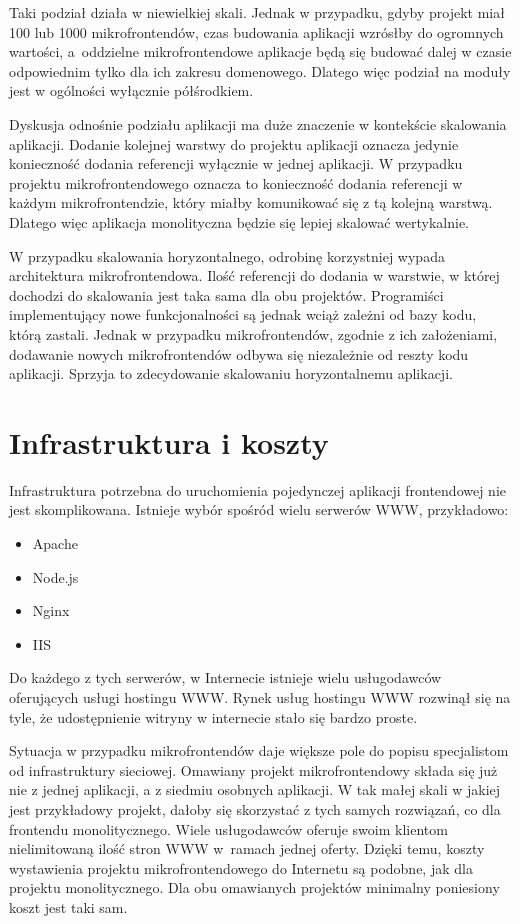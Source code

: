 \documentclass{SGGW-thesis}
\begin{document}
  Taki podział działa w niewielkiej skali. Jednak w przypadku, gdyby projekt miał 100 lub 1000 mikrofrontendów, czas budowania aplikacji wzrósłby do ogromnych wartości, a~oddzielne mikrofrontendowe aplikacje będą się budować dalej w czasie odpowiednim tylko dla ich zakresu domenowego. Dlatego więc podział na moduły jest w ogólności wyłącznie półśrodkiem.

  Dyskusja odnośnie podziału aplikacji ma duże znaczenie w kontekście skalowania aplikacji. Dodanie kolejnej warstwy do projektu aplikacji oznacza jedynie konieczność dodania referencji wyłącznie w jednej aplikacji. W przypadku projektu mikrofrontendowego oznacza to konieczność dodania referencji w każdym mikrofrontendzie, który miałby komunikować się z tą kolejną warstwą. Dlatego więc aplikacja monolityczna będzie się lepiej skalować wertykalnie.

  W przypadku skalowania horyzontalnego, odrobinę korzystniej wypada architektura mikrofrontendowa. Ilość referencji do dodania w warstwie, w której dochodzi do skalowania jest taka sama dla obu projektów. Programiści implementujący nowe funkcjonalności są jednak wciąż zależni od bazy kodu, którą zastali. Jednak w przypadku mikrofrontendów, zgodnie z ich założeniami, dodawanie nowych mikrofrontendów odbywa się niezależnie od reszty kodu aplikacji. Sprzyja to zdecydowanie skalowaniu horyzontalnemu aplikacji.

  \section{Infrastruktura i koszty}
  Infrastruktura potrzebna do uruchomienia pojedynczej aplikacji frontendowej nie jest skomplikowana. Istnieje wybór spośród wielu serwerów WWW, przykładowo:

  \begin{itemize}
    \item Apache
    \item Node.js
    \item Nginx
    \item IIS
  \end{itemize}

  Do każdego z tych serwerów, w Internecie istnieje wielu usługodawców oferujących usługi hostingu WWW. Rynek usług hostingu WWW rozwinął się na tyle, że udostępnienie witryny w internecie stało się bardzo proste.

  Sytuacja w przypadku mikrofrontendów daje większe pole do popisu specjalistom od infrastruktury sieciowej. Omawiany projekt mikrofrontendowy składa się już nie z jednej aplikacji, a z siedmiu osobnych aplikacji. W tak małej skali w jakiej jest przykładowy projekt, dałoby się skorzystać z tych samych rozwiązań, co dla frontendu monolitycznego. Wiele usługodawców \cite{ovh, az} oferuje swoim klientom nielimitowaną ilość stron WWW w~ramach jednej oferty. Dzięki temu, koszty wystawienia projektu mikrofrontendowego do Internetu są podobne, jak dla projektu monolitycznego. Dla obu omawianych projektów minimalny poniesiony koszt jest taki sam.
  
\end{document}
